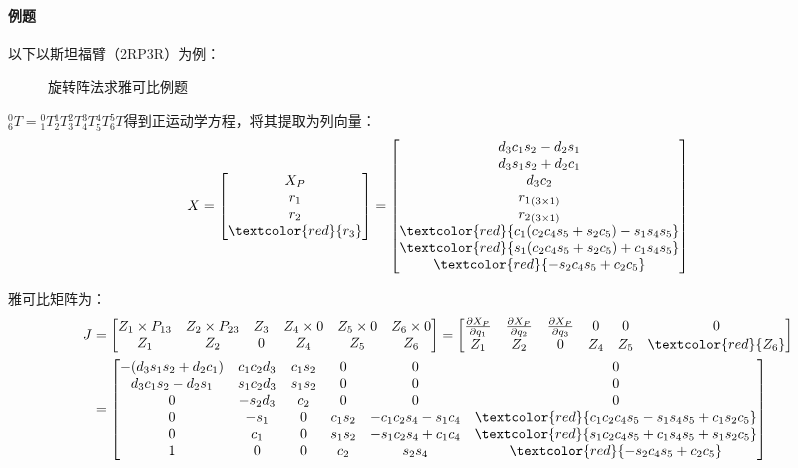 \documentclass[
12pt, %
a4paper, 
oneside, %
headinclude,footinclude, %
]{scrartcl}
\begin{document}
\paragraph{例题}
以下以斯坦福臂（2RP3R）为例：

\begin{figure}[H]
\centering
\subfloat[斯坦福臂结构图]{\texttt{[image: 4.1]}} \quad
\subfloat[参数表]{\texttt{[image: 4.2]}}
\caption[旋转阵法求雅可比例题]{旋转阵法求雅可比例题}
\end{figure}

$ _6^0T = {_1^0T}{_2^1T}{_3^2T}{_4^3T}{_5^4T}{_6^5T} $得到正运动学方程，将其提取为列向量：
{\scriptsize
$$
X = \begin{bmatrix} X_P \\ r_1 \\ r_2 \\ \textcolor{red}{r_3} \end{bmatrix}
=
\begin{bmatrix}
d_3 c_1 s_2 - d_2 s_1 \\
d_3 s_1 s_2 + d_2 c_1 \\
d_3 c_2 \\
{r_1}_{(3 \times 1)} \\
{r_2}_{(3 \times 1)} \\
\textcolor{red}{c_1(c_2 c_4 s_5 + s_2 c_5) - s_1 s_4 s_5} \\
\textcolor{red}{s_1(c_2 c_4 s_5 + s_2 c_5) + c_1 s_4 s_5} \\
\textcolor{red}{-s_2 c_4 s_5 + c_2 c_5}
\end{bmatrix}
$$}

雅可比矩阵为：
{\scriptsize
\begin{align*}
J &= \begin{bmatrix} Z_1 \times P_{13} & Z_2 \times P_{23} & Z_3 & Z_4 \times 0 & Z_5 \times 0 & Z_6 \times 0 \\ Z_1 & Z_2 & 0 & Z_4 & Z_5 & Z_6 \end{bmatrix}
= \begin{bmatrix} \frac{\partial X_P}{\partial q_1} & \frac{\partial X_P}{\partial q_2} & \frac{\partial X_P}{\partial q_3} & 0 & 0 & 0 \\ Z_1 & Z_2 & 0 & Z_4 & Z_5 & \textcolor{red}{Z_6} \end{bmatrix} \\
&=
\begin{bmatrix}
-(d_3 s_1 s_2 + d_2 c_1) & c_1 c_2 d_3 & c_1 s_2 & 0 & 0 & 0 \\
d_3 c_1 s_2 - d_2 s_1 & s_1 c_2 d_3 & s_1 s_2 & 0 & 0 & 0 \\
0 & -s_2 d_3 & c_2 & 0 & 0 & 0 \\
0 & -s_1 & 0 & c_1 s_2 & -c_1 c_2 s_4 - s_1 c_4 & \textcolor{red}{c_1 c_2 c_4 s_5 - s_1 s_4 s_5 + c_1 s_2 c_5} \\
0 & c_1 & 0 & s_1 s_2 & -s_1 c_2 s_4 + c_1 c_4 & \textcolor{red}{s_1 c_2 c_4 s_5 + c_1 s_4 s_5 + s_1 s_2 c_5} \\
1 & 0 & 0 & c_2 & s_2 s_4 & \textcolor{red}{-s_2 c_4 s_5 + c_2 c_5}
\end{bmatrix}
\end{align*}}
\end{document}
